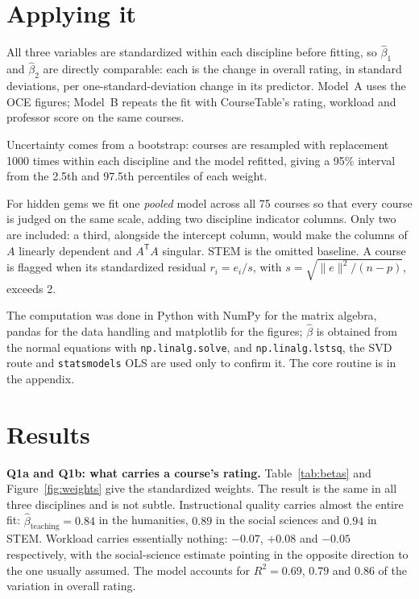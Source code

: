 \documentclass[11pt]{article}
\begin{document}
\section{Applying it}

All three variables are standardized within each discipline before fitting, so
$\hat\beta_1$ and $\hat\beta_2$ are directly comparable: each is the change in
overall rating, in standard deviations, per one-standard-deviation change in its
predictor. Model~A uses the OCE figures; Model~B repeats the fit with
CourseTable's rating, workload and professor score on the same courses.

Uncertainty comes from a bootstrap: courses are resampled with replacement 1000
times within each discipline and the model refitted, giving a 95\% interval from
the 2.5th and 97.5th percentiles of each weight.

For hidden gems we fit one \emph{pooled} model across all 75 courses so
that every course is judged on the same scale, adding two discipline indicator
columns. Only two are included: a third, alongside the intercept column, would
make the columns of $A$ linearly dependent and $A^{\mathsf T}A$ singular. STEM
is the omitted baseline. A course is flagged when its standardized residual
$r_i = e_i / s$, with $s = \sqrt{\|e\|^2/(n-p)}$, exceeds 2.

The computation was done in Python with NumPy for the matrix algebra, pandas for
the data handling and matplotlib for the figures; $\hat\beta$ is obtained from
the normal equations with \texttt{np.linalg.solve}, and
\texttt{np.linalg.lstsq}, the SVD route and \texttt{statsmodels} OLS are used
only to confirm it. The core routine is in the appendix.

\section{Results}

\textbf{Q1a and Q1b: what carries a course's rating.} Table~\ref{tab:betas} and
Figure~\ref{fig:weights} give the standardized weights. The result is the same
in all three disciplines and is not subtle. Instructional quality carries almost
the entire fit: $\hat\beta_{\text{teaching}} = 0.84$ in the humanities, $0.89$
in the social sciences and $0.94$ in STEM. Workload carries essentially nothing:
$-0.07$, $+0.08$ and $-0.05$ respectively, with the social-science estimate
pointing in the opposite direction to the one usually assumed. The model
accounts for $R^2 = 0.69$, $0.79$ and $0.86$ of the variation in overall rating.
\end{document}

